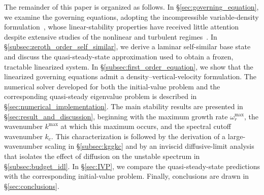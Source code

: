 \documentclass[11pt]{article}
\begin{document}
The remainder of this paper is organized as follows. In \S\ref{sec:governing_equation}, we examine the governing equations, adopting the incompressible variable-density formulation~\citep{sandoval-1995}, whose linear-stability properties have received little attention despite extensive studies of the nonlinear and turbulent regimes~\citep{livescu-ristorcelli-2007,livescu-et-al-2010,wei-livescu-2012,livescu-2013,baltzer-livescu-2020}. In \S\ref{subsec:zeroth_order_self_similar}, we derive a laminar self-similar base state and discuss the quasi-steady-state approximation used to obtain a frozen, tractable linearized system. In \S\ref{subsec:first_order_equation}, we show that the linearized governing equations admit a density--vertical-velocity formulation. The numerical solver developed for both the initial-value problem and the corresponding quasi-steady eigenvalue problem is described in \S\ref{sec:numerical_implementation}. The main stability results are presented in \S\ref{sec:result_and_discussion}, beginning with the maximum growth rate \(\omega_r^{\max}\), the wavenumber \(k^{\max}\) at which this maximum occurs, and the spectral cutoff wavenumber \(k_c\). This characterization is followed by the derivation of a large-wavenumber scaling in \S\ref{subsec:kggkc} and by an inviscid diffusive-limit analysis that isolates the effect of diffusion on the unstable spectrum in \S\ref{subsec:budget_idl}. In \S\ref{sec:IVP}, we compare the quasi-steady-state predictions with the corresponding initial-value problem. Finally, conclusions are drawn in \S\ref{sec:conclusions}.
\end{document}
